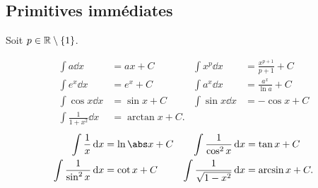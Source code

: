 \documentclass[main.tex]{subfiles}
\begin{document}
\subsection{Primitives immédiates}

\begin{proposition}

    Soit $p \in \mathbb{R} \setminus \{1\}$.

    \begin{align}
        \int a \dd x &= ax + C &
        \int x^p \dd x &= \frac {x^{p + 1}} {p + 1} + C\\
        \int e^x \dd x &= e^x + C &
        \int a^x \dd x &= \frac {a^x} {\ln a} + C\\
        \int \cos x \dd x &= \sin x + C &
        \int \sin x \dd x &= -\cos x + C\\
        \int \frac 1 {1 + x^2} \dd x &= \arctan x + C.
    \end{align}
    \begin{align}
        \int \frac 1 x \dd x &= \ln \abs x + C &
        \int \frac 1 {\cos^2 x} \dd x &= \tan x + C \\
        \int \frac 1 {\sin^2 x} \dd x &= \cot x + C &
        \int \frac 1 {\sqrt {1 - x^2}} \dd x &= \arcsin x + C.
    \end{align}
\end{proposition}
\end{document}
